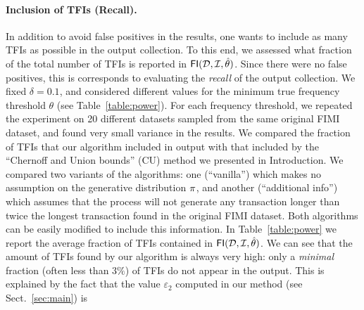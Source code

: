 \paragraph*{Inclusion of TFIs (Recall).}
In addition to avoid false positives in the results, one wants to include as many TFIs
as possible in the output collection. To this end, we assessed what fraction of
the total number of TFIs is reported in $\mathsf{FI}({\cal D},{\cal I},\hat\theta)$. Since there
were no false positives, this is corresponds to evaluating the \emph{recall} of
the output collection. We fixed $\delta=0.1$, and considered different values
for the minimum true frequency threshold $\theta$ (see Table~\ref{table:power}).
For each frequency threshold, we repeated the experiment on 20 different
datasets sampled from the same original FIMI dataset, %
and found very small variance in the results.  %
We compared the fraction of TFIs that our algorithm included in output with that
included by the ``Chernoff and Union bounds'' (CU) method we presented in
Introduction. We compared two variants of the algorithms: one
(``vanilla'') which makes no assumption on the generative distribution $\pi$,
and another (``additional info'') which assumes that the process will not
generate any transaction longer than twice the longest transaction found in the
original FIMI dataset. Both algorithms can be easily modified to include this
information. In Table~\ref{table:power} we report the average fraction of TFIs
contained in $\mathsf{FI}({\cal D},{\cal I},\hat\theta)$. 
We can see that the amount of TFIs
found by our algorithm is always very high: only a \emph{minimal}
fraction (often less than $3\%$) %
of TFIs do not appear in the output. This is explained by the fact that the
value $\varepsilon_2$ computed in our method (see Sect.~\ref{sec:main}) is
